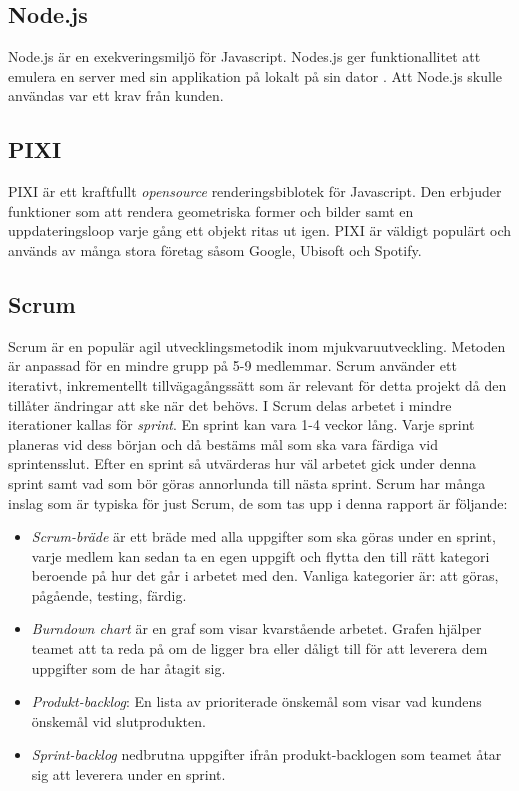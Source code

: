 \subsection*{Node.js}
Node.js är en exekveringsmiljö för Javascript. Nodes.js ger funktionallitet att emulera en server med sin applikation på lokalt på sin dator \cite{Nodejs11:online}. Att Node.js skulle användas var ett krav från kunden.

\subsection*{PIXI}
PIXI är ett kraftfullt \textit{opensource} renderingsbiblotek för Javascript\cite{PixiJSv473:online}. Den erbjuder funktioner som att rendera geometriska former och bilder samt en uppdateringsloop varje gång ett objekt ritas ut igen. PIXI är väldigt populärt och används av många stora företag såsom Google, Ubisoft och Spotify. 

\subsection*{Scrum}
Scrum är en populär agil utvecklingsmetodik inom mjukvaruutveckling. Metoden är anpassad för en mindre grupp på 5-9 medlemmar. Scrum använder ett iterativt, inkrementellt tillvägagångssätt som är relevant för detta projekt då den tillåter ändringar att ske när det behövs\cite{TheScrum81:online}. I Scrum delas arbetet i mindre iterationer kallas för \textit{sprint}. En sprint kan vara 1-4 veckor lång. Varje sprint planeras vid dess början och då bestäms mål som ska vara färdiga vid sprintensslut. Efter en sprint så utvärderas hur väl arbetet gick under denna sprint samt vad som bör göras annorlunda till nästa sprint. Scrum har många inslag som är typiska för just Scrum, de som tas upp i denna rapport är följande:

\begin{itemize}
	\item \textit{Scrum-bräde} är ett bräde med alla uppgifter som ska göras under en sprint, varje medlem kan sedan ta en egen uppgift och flytta den till rätt kategori beroende på hur det går i arbetet med den. Vanliga kategorier är: att göras, pågående, testing, färdig.
	
	\item \textit{Burndown chart} är en graf som visar kvarstående arbetet. Grafen hjälper teamet att ta reda på om de ligger bra eller dåligt till för att leverera dem uppgifter som de har åtagit sig. 
	
	\item \textit{Produkt-backlog}: En lista av prioriterade önskemål som visar vad kundens önskemål vid slutprodukten.
	
	\item \textit{Sprint-backlog} nedbrutna uppgifter ifrån produkt-backlogen som teamet åtar sig att leverera under en sprint. 	
	
\end{itemize}


